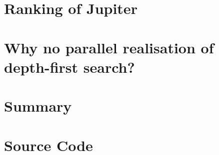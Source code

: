 \documentclass[12pt,a4paper]{article}
\begin{document}
\section{Ranking of Jupiter}
\label{sec:ranking}

\section{Why no parallel realisation of depth-first search?}
\label{sec:depth-first search}

\section{Summary}
\label{sec:summary}

\clearpage

\nocite{*}



\appendix
\section{Source Code}
\label{sec:sourcecode}

\clearpage

\clearpage


\clearpage
\end{document}
